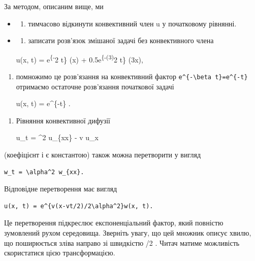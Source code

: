 \documentclass[
  ukrainian,
]{article}
\providecommand{\tightlist}{%
  \setlength{\itemsep}{0pt}\setlength{\parskip}{0pt}}
\begin{document}
За методом, описаним вище, ми

\begin{itemize}
\item
  \begin{enumerate}
  \def\labelenumi{\alph{enumi})}
  \tightlist
  \item
    тимчасово відкинути конвективний член u у початковому рівнянні.
  \end{enumerate}
\item
  \begin{enumerate}
  \def\labelenumi{\alph{enumi})}
  \setcounter{enumi}{1}
  \tightlist
  \item
    записати розв'язок змішаної задачі без конвективного члена
  \end{enumerate}

  u(x, t) = e\textsuperscript{\{-\pi}2 t\} \sin(\pi x) +
  0.5e\textsuperscript{\{-(3\pi)}2 t\} \sin(3\pi x),
\end{itemize}

\begin{enumerate}
\def\labelenumi{\alph{enumi})}
\setcounter{enumi}{2}
\item
  помножимо це розв'язання на конвективний фактор
  \texttt{e\^{}\{-\textbackslash{}beta\ t\}=e\^{}\{-t\}}отримаємо
  остаточне розв'язання початкової задачі

  u(x, t) = e\^{}\{-t\}
  .
\end{enumerate}

\begin{enumerate}
\def\labelenumi{\arabic{enumi}.}
\setcounter{enumi}{1}
\item
  Рівняння конвективної дифузії

  u\_t = \alpha\^{}2 u\_\{xx\} - v u\_x
\end{enumerate}

(коефіцієнт і є константою) також можна перетворити у вигляд

\begin{verbatim}
w_t = \alpha^2 w_{xx}.
\end{verbatim}

Відповідне перетворення має вигляд

\begin{verbatim}
u(x, t) = e^{v(x-vt/2)/2\alpha^2}w(x, t).
\end{verbatim}

Це перетворення підкреслює експоненціальний фактор, який повністю
зумовлений рухом середовища. Зверніть увагу, що цей множник описує
хвилю, що поширюється зліва направо зі швидкістю \upsilon/2 . Читач
матиме можливість скористатися цією трансформацією.
\end{document}
